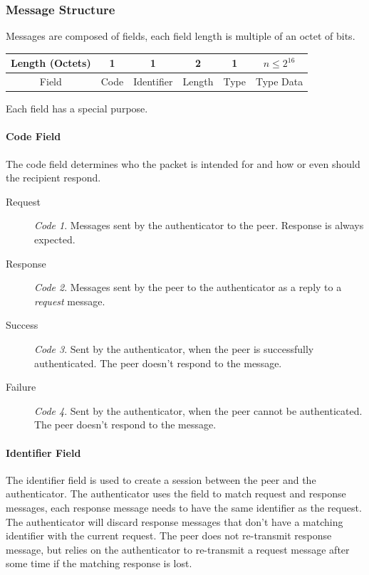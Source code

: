 \subsubsection{Message Structure}
Messages are composed of fields, each field length is multiple of an octet of bits.

\begin{center}
	\begin{tabular}{|c|c|c|c|c|c|}
		\hline
		Length (Octets) & 1 & 1 & 2 & 1 & $n \le 2^{16}$\\
		\hline
		Field & Code & Identifier & Length & Type & Type Data\\
		\hline
	\end{tabular}
\end{center}

Each field has a special purpose.

\paragraph{Code Field}
The code field determines who the packet is intended for and how or even should the recipient respond.

\begin{description}
	\item[Request]\textit{Code 1}. Messages sent by the authenticator to the peer. Response is always expected.
	\item[Response]\textit{Code 2}. Messages sent by the peer to the authenticator as a reply to a \textit{request} message.
	\item[Success]\textit{Code 3}. Sent by the authenticator, when the peer is successfully authenticated. The peer doesn't respond to the message.
	\item[Failure]\textit{Code 4}. Sent by the authenticator, when the peer cannot be authenticated. The peer doesn't respond to the message.
\end{description}

\paragraph{Identifier Field}
The identifier field is used to create a session between the peer and the authenticator.
The authenticator uses the field to match request and response messages, each response message needs to have the same identifier as the request.
The authenticator will discard response messages that don't have a matching identifier with the current request.
The peer does not re-transmit response message, but relies on the authenticator to re-transmit a request message after some time if the matching response is lost.

